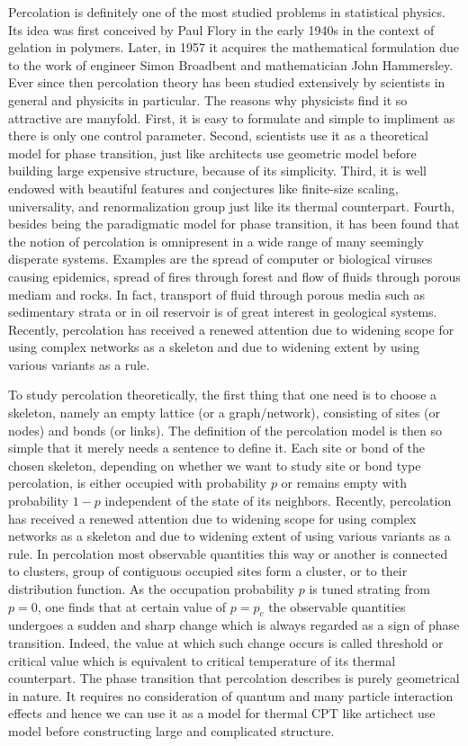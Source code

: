 ﻿\documentclass[twocolumn,showpacs,preprintnumbers,amsmath,amssymb]{revtex4}
\begin{document}
Percolation is definitely one of the most studied problems in statistical physics. Its idea was first conceived
by Paul Flory in the early 1940s in the context of gelation in polymers. Later, in 1957 it acquires the mathematical 
formulation due to the work of engineer Simon Broadbent and mathematician John Hammersley. Ever since then
percolation theory has been studied extensively by scientists in general
and physicits in particular. The reasons why
physicists find it so attractive are manyfold. First, it is easy
to formulate and simple to impliment as there is only one control parameter. Second, scientists use it as a theoretical model
for phase transition, just like
architects use geometric model before building large expensive
structure, because of its simplicity. Third, it is well endowed with beautiful features and 
conjectures like finite-size scaling, universality, and renormalization group just like its thermal counterpart.
Fourth, besides being the paradigmatic model for phase transition, it has been found that the notion of percolation is omnipresent in a wide 
range of many seemingly disperate systems. Examples are the spread of computer or biological viruses causing epidemics, spread of fires through forest and flow of fluids through porous mediam and rocks.
In fact, transport of fluid through porous media such as sedimentary strata or in oil reservoir is of 
great interest in geological systems. Recently, percolation has received a renewed attention 
due to widening scope for using complex networks as a skeleton and due to widening extent by using 
various variants as a rule. 

To study percolation theoretically, the first thing that one need is to choose a skeleton, 
namely an empty lattice (or a graph/network), consisting of sites (or nodes) and bonds (or links).
The definition of the percolation model is then so simple that it merely needs a sentence
to define it. 
Each site or bond of the chosen skeleton, depending on whether we want to study site or bond type percolation,
is either occupied with probability $p$ or remains empty with probability $1-p$ 
independent of the state of its neighbors. Recently, percolation has received a renewed attention 
due to widening scope for using complex networks as a skeleton and due to widening extent of using 
various variants as a rule. 
In percolation most observable quantities
this way or another is connected to clusters, group of contiguous occupied sites form a cluster, or to 
their distribution function. As 
the occupation probability $p$ is tuned strating from $p=0$, one finds that at certain value of $p=p_c$ the observable
quantities undergoes a sudden and sharp change which is always regarded as a sign
of phase transition. Indeed, the value at which such change occurs
is called threshold or critical value which is equivalent to critical temperature of its thermal counterpart. 
The phase transition that percolation describes is purely geometrical in nature. It requires 
no consideration of quantum and many particle interaction effects and hence we can use it as a model for 
thermal CPT like artichect use model before constructing large and complicated structure.
\end{document}
